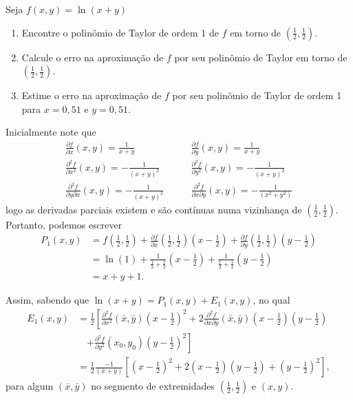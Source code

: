 \begin{example}
    Seja \(f(x,y) = \ln(x+y)\)
        \begin{enumerate}
            \item Encontre o polinômio de Taylor de ordem 1 de \(f\) em torno de \((\frac{1}{2},\frac{1}{2})\).
            \item Calcule o erro na aproximação de \(f\) por seu polinômio de Taylor em torno de \((\frac{1}{2},\frac{1}{2})\).
            \item Estime o erro na aproximação de \(f\) por seu polinômio de Taylor de ordem 1 para \(x = 0,51\) e \(y = 0,51\).
        \end{enumerate}

    Inicialmente note que
        \begin{align*}
            \frac{\partial f}{\partial x}(x,y) = \frac{1}{x+y}\quad &\quad \frac{\partial f}{\partial y}(x,y) = \frac{1}{x+y} \\
            \frac{\partial^2 f}{\partial x^2}(x,y) = -\frac{1}{(x+y)^2} \quad &\quad \frac{\partial^2 f}{\partial y^2}(x,y) = -\frac{1}{(x+y)^2} \\
            \frac{\partial^2 f}{\partial y \partial x}(x,y) = -\frac{1}{(x+y)^2} \quad &\quad \frac{\partial^2 f}{\partial x \partial y}(x,y) = -\frac{1}{(x^2+y^2)}
        \end{align*}
    logo as derivadas parciais existem e são contínuas numa vizinhança de \((\frac{1}{2},\frac{1}{2})\). Portanto, podemos escrever
        \begin{align*}
            P_1(x,y)
                & = f(\frac{1}{2},\frac{1}{2}) + \frac{\partial f}{\partial x}(\frac{1}{2},\frac{1}{2})(x-\frac{1}{2}) + \frac{\partial f}{\partial y}(\frac{1}{2},\frac{1}{2})(y-\frac{1}{2}) \\
                & = \ln(1) + \frac{1}{\frac{1}{2} + \frac{1}{2}}(x-\frac{1}{2}) + \frac{1}{\frac{1}{2} + \frac{1}{2}}(y-\frac{1}{2}) \\
                & = x + y + 1.
        \end{align*}

    Assim, sabendo que \(\ln(x+y) = P_1(x,y) + E_1(x,y)\), no qual
        \begin{align*}
            E_1(x,y)
                & = \frac{1}{2}\left[ \frac{\partial^2 f}{\partial x^2}(\bar{x},\bar{y})(x-\frac{1}{2})^2 + 2\frac{\partial^2 f}{\partial x \partial y}(\bar{x},\bar{y})(x-\frac{1}{2})(y-\frac{1}{2}) \right. \\
                    & \quad \left. + \frac{\partial^2 f}{\partial y^2}(x_0,y_0)(y-\frac{1}{2})^2 \right] \\
            & = \frac{1}{2} \frac{-1}{(\bar{x}+\bar{y})}\left[ (x-\frac{1}{2})^2 + 2(x-\frac{1}{2})(y-\frac{1}{2}) + (y-\frac{1}{2})^2 \right],
        \end{align*}
    para algum \((\bar{x},\bar{y})\) no segmento de extremidades \((\frac{1}{2},\frac{1}{2})\) e \((x,y)\).


\end{example}
